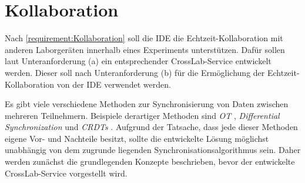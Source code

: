 \section{Kollaboration}\label{section:konzeption:kollaboration}

\usetikzlibrary{arrows.meta}


Nach \autoref{requirement:Kollaboration} soll die IDE die Echtzeit-Kollaboration mit anderen Laborgeräten innerhalb eines Experiments unterstützen. Dafür sollen laut Unteranforderung (a) ein entsprechender CrossLab-Service entwickelt werden. Dieser soll nach Unteranforderung (b) für die Ermöglichung der Echtzeit-Kollaboration von der IDE verwendet werden.

Es gibt viele verschiedene Methoden zur Synchronisierung von Daten zwischen mehreren Teilnehmern. Beispiele derartiger Methoden sind \emph{\ac{OT}} \cite{sun_operational_1998}, \emph{Differential Synchronization} \cite{fraser_differential_2009} und \emph{\acp{CRDT}} \cite{shapiro_conflict-free_2011}. Aufgrund der Tatsache, dass jede dieser Methoden eigene Vor- und Nachteile besitzt, sollte die entwickelte Lösung möglichst unabhängig von dem zugrunde liegenden Synchronisationsalgorithmus sein. Daher werden zunächst die grundlegenden Konzepte beschrieben, bevor der entwickelte CrossLab-Service vorgestellt wird.

